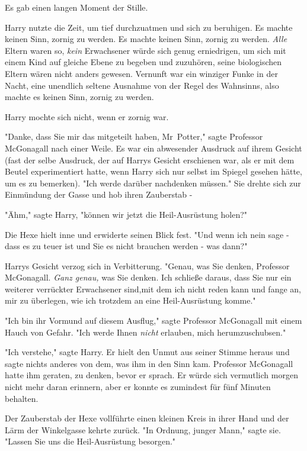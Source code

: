 {Es gab einen langen Moment der Stille.

Harry nutzte die Zeit, um tief durchzuatmen und sich zu beruhigen. Es machte keinen Sinn, zornig zu werden. Es machte keinen Sinn, zornig zu werden. \emph{Alle} Eltern waren so, \emph{kein} Erwachsener würde sich genug erniedrigen, um sich mit einem Kind auf gleiche Ebene zu begeben und zuzuhören, seine biologischen Eltern wären nicht anders gewesen. Vernunft war ein winziger Funke in der Nacht, eine unendlich seltene Ausnahme von der Regel des Wahnsinns, also machte es keinen Sinn, zornig zu werden.

Harry mochte sich nicht, wenn er zornig war.

"Danke, dass Sie mir das mitgeteilt haben, Mr~Potter," sagte Professor McGonagall nach einer Weile. Es war ein abwesender Ausdruck auf ihrem Gesicht (fast der selbe Ausdruck, der auf Harrys Gesicht erschienen war, als er mit dem Beutel experimentiert hatte, wenn Harry sich nur selbst im Spiegel gesehen hätte, um es zu bemerken). "Ich werde darüber nachdenken müssen." Sie drehte sich zur Einmündung der Gasse und hob ihren Zauberstab -

"Ähm," sagte Harry, "können wir jetzt die Heil-Ausrüstung holen?"

Die Hexe hielt inne und erwiderte seinen Blick fest. "Und wenn ich nein sage - dass es zu teuer ist und Sie es nicht brauchen werden - was dann?"

Harrys Gesicht verzog sich in Verbitterung. "Genau, was Sie denken, Professor McGonagall. \emph{Ganz genau,} was Sie denken. Ich schließe daraus, dass Sie nur ein weiterer verrückter Erwachsener sind,mit dem ich nicht reden kann und fange an, mir zu überlegen, wie ich trotzdem an eine Heil-Ausrüstung komme."

"Ich bin ihr Vormund auf diesem Ausflug," sagte Professor McGonagall mit einem Hauch von Gefahr. "Ich werde Ihnen \emph{nicht} erlauben, mich herumzuschubsen."

"Ich verstehe," sagte Harry. Er hielt den Unmut aus seiner Stimme heraus und sagte nichts anderes von dem, was ihm in den Sinn kam. Professor McGonagall hatte ihm geraten, zu denken, bevor er sprach. Er würde sich vermutlich morgen nicht mehr daran erinnern, aber er konnte es zumindest für fünf Minuten behalten.

Der Zauberstab der Hexe vollführte einen kleinen Kreis in ihrer Hand und der Lärm der Winkelgasse kehrte zurück. "In Ordnung, junger Mann," sagte sie. "Lassen Sie uns die Heil-Ausrüstung besorgen."

}
